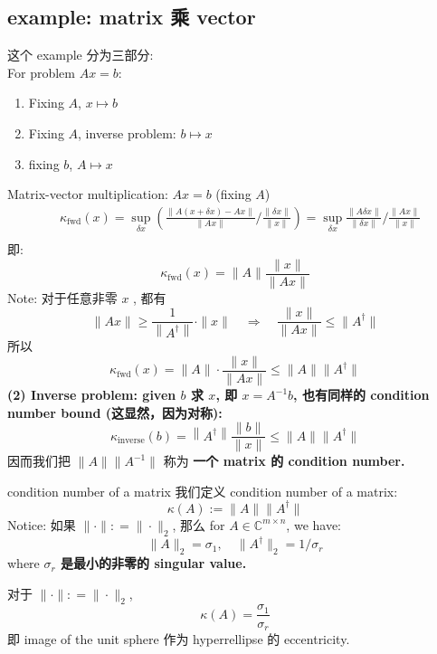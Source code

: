 \subsection{example: matrix 乘 vector}
这个 example 分为三部分: \\
For problem $Ax = b$:
\begin{enumerate}
    \item Fixing $A$, $x\mapsto b$
    \item Fixing $A$, inverse problem: $b \mapsto x$
    \item fixing $b$, $A\mapsto x$
\end{enumerate}
\begin{example}
    Matrix-vector multiplication: $Ax = b$ (fixing $A$)
$$
\begin{aligned}
&\kappa_{\mathrm{fwd}}(x)=\sup _{\delta x}\left(\frac{\|A(x+\delta x)-A x\|}{\|A x\|} / \frac{\|\delta x\|}{\|x\|}\right)=\sup _{\delta x} \frac{\|A \delta x\|}{\|\delta x\|} / \frac{\|A x\|}{\|x\|}\\
\end{aligned}
$$  即:\[
\kappa_{\mathrm{fwd}}(x)=\|A\| \frac{\|x\|}{\|A x\|}
\]
Note: 对于任意非零 $x$ , 都有
$$
\|A x\| \geq \frac{1}{\left\|A^{\dagger}\right\|} \cdot\|x\| \quad \Longrightarrow \quad \frac{\|x\|}{\|A x\|} \leq\|A^{\dagger}\|
$$所以 $$
\kappa_{\mathrm{fwd}}(x)=\|A\| \cdot \frac{\|x\|}{\|A x\|} \leq\|A\| \|A^{\dagger}\|
$$
\textbf{(2) Inverse problem: given $b$ 求 $x$, 即 $x = A^{-1} b$, 也有同样的 condition number bound (这显然，因为对称):} $$
\kappa_{\mathrm{inverse}}(b)=\left\|A^{\dagger}\right\| \frac{\|b\|}{\|x\|} \leq \|A\| \|A^{\dagger}\|
$$ 因而我们把 $\|A\| \|A^{-1}\| $ 称为 \textbf{一个 matrix 的 condition number.}
\begin{definition}{condition number of a matrix}
我们定义 condition number of a matrix: \[
    \kappa(A) := \|A\| \|A^{\dagger}\|
    \]
Notice: 如果 $\| \cdot \| : = \|\cdot \|_2$, 那么 for $A \in \mathbb{C}^{m\times n}$, we have: \[
\| A \|_2 = \sigma_1,\quad \| A ^{\dagger} \|_2 = 1/\sigma_r
\]where\textbf{ $\sigma_r$ 是最小的非零的 singular value.}
\end{definition}
对于 $\| \cdot \| : = \|\cdot \|_2$, \[
 \kappa(A) = \frac{\sigma_1}{\sigma_r}
\]即 image of the unit sphere 作为 hyperrellipse 的 eccentricity.
\end{example}
